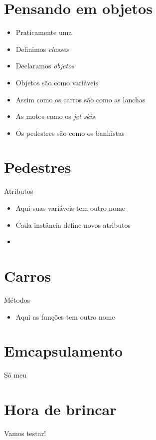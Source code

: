 \documentclass[14pt]{beamer}
\subtitle{Sente, deite, role}
\begin{document}
	
	\begin{frame}
		\titlepage
	\end{frame}

	\begin{frame}
		\tableofcontents
	\end{frame}

	\section{Pensando em objetos}
		\begin{frame}
			\begin{itemize}
				\presentationPause\item Praticamente uma \basicCode{struct}
				\presentationPause\item Definimos \emph{classes}
				\presentationPause\item Declaramos \emph{objetos}
				\presentationPause\item Objetos são como variáveis
				\presentationPause\item Assim como os carros são como as lanchas
				\presentationPause\item As motos como os \textit{jet skis}
				\presentationPause\item Os pedestres são como os banhistas
			\end{itemize}
		\end{frame}

	\section{Pedestres}
		\begin{frame}{Atributos}
			\begin{itemize}
				\presentationPause\item Aqui suas variáveis tem outro nome
				\presentationPause\item Cada instância define novos atributos
				\presentationPause\item 
			\end{itemize}
		\end{frame}

	\section{Carros}
		\begin{frame}{Métodos}
			\begin{itemize}
				\presentationPause\item Aqui as funções tem outro nome
			\end{itemize}
		\end{frame}

	\section{Emcapsulamento}
		\begin{frame}{Só meu}
			
		\end{frame}

	\section{Hora de brincar}
		\begin{frame}
			\begin{center}\Huge
				Vamos testar!
			\end{center}
		\end{frame}

	
\end{document}
